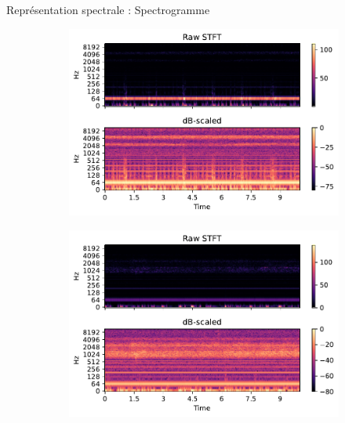 \documentclass[compress,xcolor=table]{beamer}
\begin{document}
\begin{frame}{Représentation spectrale : Spectrogramme}

    \begin{figure}[ht]
        \centering
        \begin{subfigure}[b]{0.45\textwidth}
            \centering
            \includegraphics[width=\textwidth]{../images/audio/birds.spectrogram.birdvox.pdf}
            \label{fig:birds.spectrogram.birdvox}
        \end{subfigure}
        \hfill
        \begin{subfigure}[b]{0.45\textwidth}
            \centering
            \includegraphics[width=\textwidth]{../images/audio/nobirds.spectrogram.birdvox.pdf}
            \label{fig:nobirds.spectrogram.birdvox}
        \end{subfigure}


\end{figure}
\end{frame}
\end{document}
